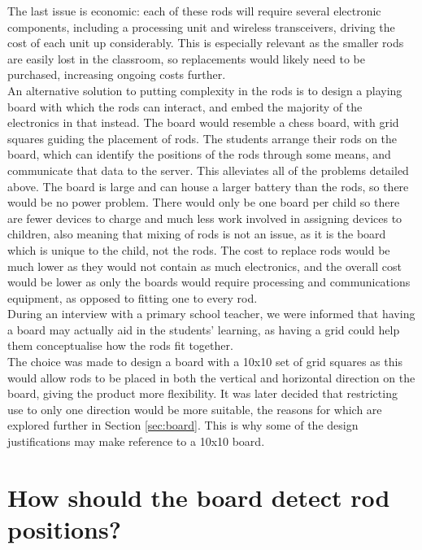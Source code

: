 The last issue is economic: each of these rods will require several electronic components, including a processing unit and wireless transceivers, driving the cost of each unit up considerably. This is especially relevant as the smaller rods are easily lost in the classroom, so replacements would likely need to be purchased, increasing ongoing costs further.\\

An alternative solution to putting complexity in the rods is to design a playing board with which the rods can interact, and embed the majority of the electronics in that instead. The board would resemble a chess board, with grid squares guiding the placement of rods. The students arrange their rods on the board, which can identify the positions of the rods through some means, and communicate that data to the server. This alleviates all of the problems detailed above. The board is large and can house a larger battery than the rods, so there would be no power problem. There would only be one board per child so there are fewer devices to charge and much less work involved in assigning devices to children, also meaning that mixing of rods is not an issue, as it is the board which is unique to the child, not the rods. The cost to replace rods would be much lower as they would not contain as much electronics, and the overall cost would be lower as only the boards would require processing and communications equipment, as opposed to fitting one to every rod.\\ 

During an interview with a primary school teacher, we were informed that having a board may actually aid in the students’ learning, as having a grid could help them conceptualise how the rods fit together.\\

The choice was made to design a board with a 10x10 set of grid squares as this would allow rods to be placed in both the vertical and horizontal direction on the board, giving the product more flexibility. It was later decided that restricting use to only one direction would be more suitable, the reasons for which are explored further in Section \ref{sec:board}. This is why some of the design justifications may make reference to a 10x10 board.

\section{How should the board detect rod positions?}
\label{sec:detection}  


